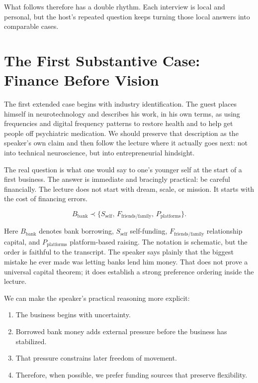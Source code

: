 What follows therefore has a double rhythm. Each interview is local and personal, but the host's repeated question keeps turning those local answers into comparable cases.

\section{The First Substantive Case: Finance Before Vision}

The first extended case begins with industry identification. The guest places himself in neurotechnology and describes his work, in his own terms, as using frequencies and digital frequency patterns to restore health and to help get people off psychiatric medication. We should preserve that description as the speaker's own claim and then follow the lecture where it actually goes next: not into technical neuroscience, but into entrepreneurial hindsight.

The real question is what one would say to one's younger self at the start of a first business. The answer is immediate and bracingly practical: be careful financially. The lecture does not start with dream, scale, or mission. It starts with the cost of financing errors.

\begin{equation}
B_{\mathrm{bank}} \prec \{S_{\mathrm{self}},\,F_{\mathrm{friends/family}},\,P_{\mathrm{platforms}}\}.
\end{equation}

Here \(B_{\mathrm{bank}}\) denotes bank borrowing, \(S_{\mathrm{self}}\) self-funding, \(F_{\mathrm{friends/family}}\) relationship capital, and \(P_{\mathrm{platforms}}\) platform-based raising. The notation is schematic, but the order is faithful to the transcript. The speaker says plainly that the biggest mistake he ever made was letting banks lend him money. That does not prove a universal capital theorem; it does establish a strong preference ordering inside the lecture.

We can make the speaker's practical reasoning more explicit:
\begin{enumerate}
\item The business begins with uncertainty.
\item Borrowed bank money adds external pressure before the business has stabilized.
\item That pressure constrains later freedom of movement.
\item Therefore, when possible, we prefer funding sources that preserve flexibility.
\end{enumerate}

